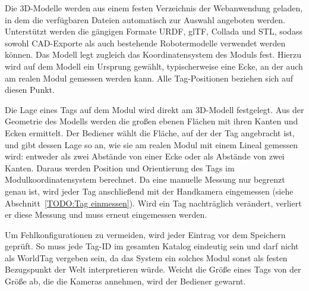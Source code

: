 Die 3D-Modelle werden aus einem festen Verzeichnis der Webanwendung geladen, in dem die verfügbaren Dateien automatisch zur Auswahl angeboten werden. Unterstützt werden die gängigen Formate URDF, glTF, Collada und STL, sodass sowohl CAD-Exporte als auch bestehende Robotermodelle verwendet werden können. Das Modell legt zugleich das Koordinatensystem des Moduls fest. Hierzu wird auf dem Modell ein Ursprung gewählt, typischerweise eine Ecke, an der auch am realen Modul gemessen werden kann. Alle Tag-Positionen beziehen sich auf diesen Punkt.

Die Lage eines Tags auf dem Modul wird direkt am 3D-Modell festgelegt. Aus der Geometrie des Modells werden die großen ebenen Flächen mit ihren Kanten und Ecken ermittelt. Der Bediener wählt die Fläche, auf der der Tag angebracht ist, und gibt dessen Lage so an, wie sie am realen Modul mit einem Lineal gemessen wird: entweder als zwei Abstände von einer Ecke oder als Abstände von zwei Kanten. Daraus werden Position und Orientierung des Tags im Modulkoordinatensystem berechnet. Da eine manuelle Messung nur begrenzt genau ist, wird jeder Tag anschließend mit der Handkamera eingemessen (siehe Abschnitt~\ref{TODO:Tag einmessen}). Wird ein Tag nachträglich verändert, verliert er diese Messung und muss erneut eingemessen werden.

Um Fehlkonfigurationen zu vermeiden, wird jeder Eintrag vor dem Speichern geprüft. So muss jede Tag-ID im gesamten Katalog eindeutig sein und darf nicht als WorldTag vergeben sein, da das System ein solches Modul sonst als festen Bezugspunkt der Welt interpretieren würde. Weicht die Größe eines Tags von der Größe ab, die die Kameras annehmen, wird der Bediener gewarnt.

